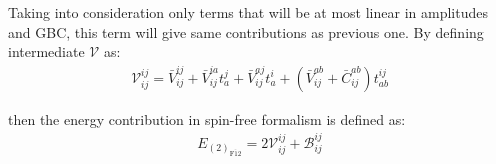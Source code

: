 \documentclass[journal=jacsat]{achemso}
\numberwithin{equation}{section}
\begin{document}
Taking into consideration only terms that will be at most linear in amplitudes and GBC, this term will give same contributions as previous one.
By defining intermediate $\mathcal{V}$ as:
\begin{align}
\mathcal{V}^{ij}_{ij}=\bar{V}^{ij}_{ij}+\bar{V}^{ia}_{ij}t^{j}_{a}+\bar{V}^{aj}_{ij}t^{i}_{a}+(\bar{V}^{ab}_{ij}+\bar{C}^{ab}_{ij})t^{ij}_{ab}
\end{align}   

then the energy contribution in spin-free formalism is defined as:
\begin{align}
E_{(2)_{\overline{\text{F12}}}}=2\mathcal{V}^{ij}_{ij}+\mathcal{B}^{ij}_{ij}
\end{align}   
\end{document}
